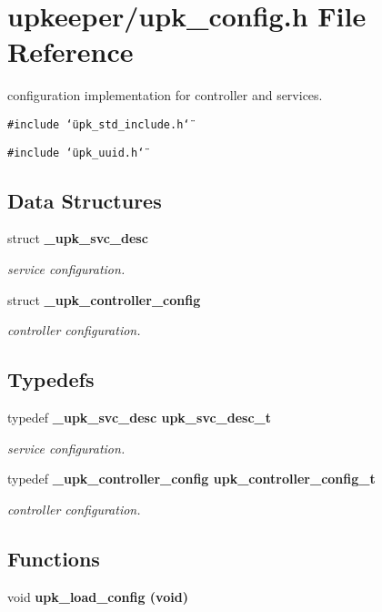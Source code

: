 \section{upkeeper/upk\_\-config.h File Reference}
\label{upk__config_8h}
configuration implementation for controller and services. 

{\tt \#include \char`\"{}upk\_\-std\_\-include.h\char`\"{}}\par
{\tt \#include \char`\"{}upk\_\-uuid.h\char`\"{}}\par
\subsection*{Data Structures}
\begin{CompactItemize}
\item 
struct \bf{\_\-upk\_\-svc\_\-desc}
\begin{CompactList}\small\item\em service configuration. \item\end{CompactList}\item 
struct \bf{\_\-upk\_\-controller\_\-config}
\begin{CompactList}\small\item\em controller configuration. \item\end{CompactList}\end{CompactItemize}
\subsection*{Typedefs}
\begin{CompactItemize}
\item 
typedef \bf{\_\-upk\_\-svc\_\-desc} \bf{upk\_\-svc\_\-desc\_\-t}
\begin{CompactList}\small\item\em service configuration. \item\end{CompactList}\item 
typedef \bf{\_\-upk\_\-controller\_\-config} \bf{upk\_\-controller\_\-config\_\-t}
\begin{CompactList}\small\item\em controller configuration. \item\end{CompactList}\end{CompactItemize}
\subsection*{Functions}
\begin{CompactItemize}
\item 
void \bf{upk\_\-load\_\-config} (void)
\end{CompactItemize}
